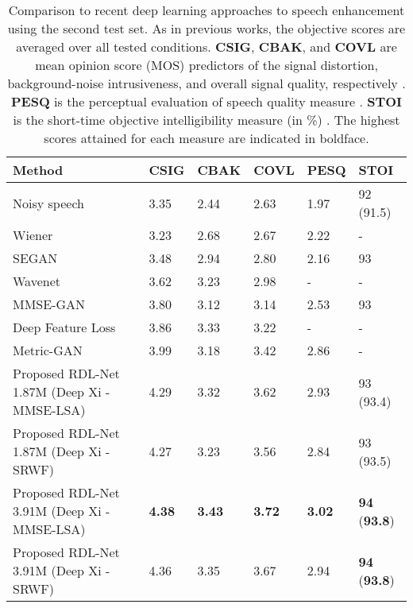 \documentclass[letterpaper]{article} \usepackage{aaai20}  \usepackage{times}  \usepackage{helvet} \usepackage{courier}  \usepackage[hyphens]{url}  \usepackage{graphicx} \urlstyle{rm} \def\UrlFont{\rm}  \usepackage{graphicx}  \frenchspacing  \setlength{\pdfpagewidth}{8.5in}  \setlength{\pdfpageheight}{11in}
\begin{document}
\begin{table*}[ht]
	\centering
\caption{Comparison to recent deep learning approaches to speech enhancement using the second test set. As in previous works, the objective scores are averaged over all tested conditions. \textbf{CSIG}, \textbf{CBAK}, and \textbf{COVL} are mean opinion score (MOS) predictors of the signal distortion, background-noise intrusiveness, and overall signal quality, respectively \cite{4389058}. \textbf{PESQ} is the perceptual evaluation of speech quality measure \cite{4389058}. \textbf{STOI} is the short-time objective intelligibility measure (in \%) \cite{short_obj}. The highest scores attained for each measure are indicated in boldface.}
\begin{tabular}{@{}llllll@{}}
\toprule
\textbf{Method}                            & \textbf{CSIG} & \textbf{CBAK} & \textbf{COVL} & \textbf{PESQ} & \textbf{STOI} \\ \midrule
Noisy speech & 3.35 & 2.44 & 2.63 & 1.97   & 92 (91.5)  \\
Wiener \cite{Wiener}           & 3.23          & 2.68          & 2.67          & 2.22   & -  \\
SEGAN \cite{segan}               & 3.48          & 2.94          & 2.80          & 2.16 & 93         \\
Wavenet \cite{wavenet}             & 3.62          & 3.23          & 2.98          & - & -            \\
MMSE-GAN \cite{MMSE-GAN}            & 3.80          & 3.12          & 3.14          & 2.53 & 93         \\
Deep Feature Loss \cite{deep_floss}   & 3.86          & 3.33 & 3.22          & -    & -         \\
Metric-GAN \cite{metric-GAN}            & 3.99          & 3.18          & 3.42          & 2.86 & -         \\ \midrule

Proposed RDL-Net 1.87M (Deep Xi - MMSE-LSA)                             & 4.29          & 3.32          & 3.62          & 2.93 & 93 (93.4) \\
Proposed RDL-Net 1.87M (Deep Xi - SRWF)                                 & 4.27 & 3.23          & 3.56 & 2.84 & 93 (93.5)\\ 
Proposed RDL-Net 3.91M (Deep Xi - MMSE-LSA)                             & \textbf{4.38}          & \textbf{3.43}          & \textbf{3.72}          & \textbf{3.02} & \textbf{94} (\textbf{93.8}) \\
Proposed RDL-Net 3.91M (Deep Xi - SRWF)                             & 4.36          & 3.35         & 3.67         & 2.94 & \textbf{94} (\textbf{93.8}) \\ \bottomrule
\end{tabular}
\label{table-stoa}
\end{table*}
\end{document}
